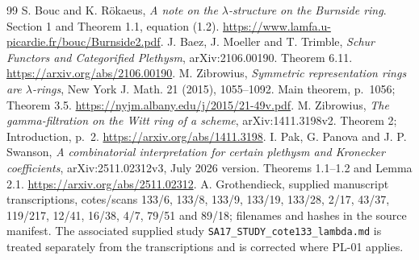 \documentclass[11pt,a4paper]{article}
\begin{document}
\begin{thebibliography}{99}
 S. Bouc and K. R\"okaeus, \emph{A note on the $\lambda$-structure on the Burnside ring}. Section 1 and Theorem 1.1, equation (1.2). \url{https://www.lamfa.u-picardie.fr/bouc/Burnside2.pdf}.
 J. Baez, J. Moeller and T. Trimble, \emph{Schur Functors and Categorified Plethysm}, arXiv:2106.00190. Theorem 6.11. \url{https://arxiv.org/abs/2106.00190}.
 M. Zibrowius, \emph{Symmetric representation rings are $\lambda$-rings}, New York J. Math. 21 (2015), 1055--1092. Main theorem, p.~1056; Theorem 3.5. \url{https://nyjm.albany.edu/j/2015/21-49v.pdf}.
 M. Zibrowius, \emph{The gamma-filtration on the Witt ring of a scheme}, arXiv:1411.3198v2. Theorem 2; Introduction, p.~2. \url{https://arxiv.org/abs/1411.3198}.
 I. Pak, G. Panova and J. P. Swanson, \emph{A combinatorial interpretation for certain plethysm and Kronecker coefficients}, arXiv:2511.02312v3, July 2026 version. Theorems 1.1--1.2 and Lemma 2.1. \url{https://arxiv.org/abs/2511.02312}.
 A. Grothendieck, supplied manuscript transcriptions, cotes/scans 133/6, 133/8, 133/9, 133/19, 133/28, 2/17, 43/37, 119/217, 12/41, 16/38, 4/7, 79/51 and 89/18; filenames and hashes in the source manifest. The associated supplied study \texttt{SA17\_STUDY\_cote133\_lambda.md} is treated separately from the transcriptions and is corrected where PL-01 applies.



\end{thebibliography}
\end{document}
